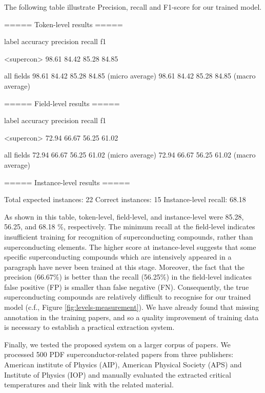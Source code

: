 \documentclass{article}[a4]
\begin{document}
The following table illustrate Precision, recall and F1-score for our trained model.

\begin{verbnobox}[\small]
===== Token-level results =====

label                accuracy     precision    recall       f1     

<supercon>           98.61        84.42        85.28        84.85  

all fields           98.61        84.42        85.28        84.85   (micro average)
                     98.61        84.42        85.28        84.85   (macro average)

===== Field-level results =====

label                accuracy     precision    recall       f1     

<supercon>           72.94        66.67        56.25        61.02  

all fields           72.94        66.67        56.25        61.02   (micro average)
                     72.94        66.67        56.25        61.02   (macro average)

===== Instance-level results =====

Total expected instances:   22
Correct instances:          15
Instance-level recall:      68.18
\end{verbnobox}

As shown in this table, token-level, field-level, and instance-level were 85.28, 56.25, and 68.18 \%, respectively. The minimum recall at the field-level indicates insufficient training for recognition of superconducting compounds, rather than superconducting elements. The higher score at instance-level suggests that some specific superconducting compounds which are intensively appeared in a paragraph have never been trained at this stage. Moreover, the fact that the precision (66.67\%) is better than the recall (56.25\%) in the field-level indicates false positive (FP) is smaller than false negative (FN). Consequently, the true superconducting compounds are relatively difficult to recognise for our trained model (c.f., Figure \ref{fig:levels-measurement}). We have already found that missing annotation in the training papers, and so a quality improvement of training data is necessary to establish a practical extraction system.

Finally, we tested the proposed system on a larger corpus of papers. We processed 500 PDF superconductor-related papers from three publishers: American institute of Physics (AIP), American Physical Society (APS) and Institute of Physics (IOP) and manually evaluated the extracted critical temperatures and their link with the related material. 
\end{document}
